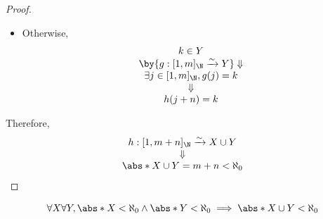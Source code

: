 \begin{proof}
\begin{itemize}
\begin{itemize}
                  \[
                    \begin{array}{c}
                      k \in X                                                          \\
                      \by{\ensuremath{f: [1, n]_{\N} \xrightarrow{\sim} X}} \Downarrow \\
                      \exists i \in [1, n]_{\N}, f(i) = k                              \\
                      \Downarrow                                                       \\
                      h(i) = k
                    \end{array}
                  \]
            \item Otherwise,
                  \[
                    \begin{array}{c}
                      k \in Y                                                          \\
                      \by{\ensuremath{g: [1, m]_{\N} \xrightarrow{\sim} Y}} \Downarrow \\
                      \exists j \in [1, m]_{\N}, g(j) = k                              \\
                      \Downarrow                                                       \\
                      h(j + n) = k
                    \end{array}
                  \]
          \end{itemize}
  \end{itemize}
  Therefore,
  \[
    \begin{array}{c}
      h: [1, m + n]_{\N} \xrightarrow{\sim} X \cup Y \\
      \Downarrow                                     \\
      \abs*{X \cup Y} = m + n < \aleph_{0}
    \end{array}
  \]
\end{proof}

\bigskip

\begin{lemma} \label{an:lem:union-of-two-finite-sets-is-finite}
  \[
    \forall X \forall Y, \abs*{X} < \aleph_{0} \land \abs*{Y} < \aleph_{0}
    \implies \abs*{X \cup Y} < \aleph_{0}
  \]
\end{lemma}

